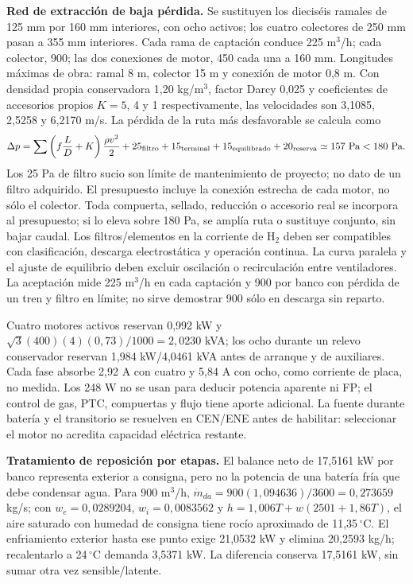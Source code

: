 \textbf{Red de extracción de baja pérdida.} Se sustituyen los dieciséis ramales de 125 mm por 160 mm interiores, con ocho activos; los cuatro colectores de 250 mm pasan a 355 mm interiores. Cada rama de captación conduce 225 m$^3$/h; cada colector, 900; las dos conexiones de motor, 450 cada una a 160 mm. Longitudes máximas de obra: ramal 8 m, colector 15 m y conexión de motor 0,8 m. Con densidad propia conservadora 1,20 kg/m$^3$, factor Darcy 0,025 y coeficientes de accesorios propios $K=5$, 4 y 1 respectivamente, las velocidades son 3,1085, 2,5258 y 6,2170 m/s. La pérdida de la ruta más desfavorable se calcula como
\[
\Delta p=\sum\left(f\frac{L}{D}+K\right)\frac{\rho v^2}{2}
       +25_{\rm filtro}+15_{\rm terminal}+15_{\rm equilibrado}+20_{\rm reserva}
       \simeq157\ {\rm Pa}<180\ {\rm Pa}.
\]
Los 25 Pa de filtro sucio son límite de mantenimiento de proyecto; no dato de un filtro adquirido. El presupuesto incluye la conexión estrecha de cada motor, no sólo el colector. Toda compuerta, sellado, reducción o accesorio real se incorpora al presupuesto; si lo eleva sobre 180 Pa, se amplía ruta o sustituye conjunto, sin bajar caudal. Los filtros/elementos en la corriente de H$_2$ deben ser compatibles con clasificación, descarga electrostática y operación continua. La curva paralela y el ajuste de equilibrio deben excluir oscilación o recirculación entre ventiladores. La aceptación mide 225 m$^3$/h en cada captación y 900 por banco con pérdida de un tren y filtro en límite; no sirve demostrar 900 sólo en descarga sin reparto.

Cuatro motores activos reservan 0,992 kW y $\sqrt{3}(400)(4)(0,73)/1000=2,0230$ kVA; los ocho durante un relevo conservador reservan 1,984 kW/4,0461 kVA antes de arranque y de auxiliares. Cada fase absorbe 2,92 A con cuatro y 5,84 A con ocho, como corriente de placa, no medida. Los 248 W no se usan para deducir potencia aparente ni FP; el control de gas, PTC, compuertas y flujo tiene aporte adicional. La fuente durante batería y el transitorio se resuelven en CEN/ENE antes de habilitar: seleccionar el motor no acredita capacidad eléctrica restante.

\textbf{Tratamiento de reposición por etapas.} El balance neto de 17,5161 kW por banco representa exterior a consigna, pero no la potencia de una batería fría que debe condensar agua. Para 900 m$^3$/h, $\dot m_{da}=900(1,094636)/3600=0,273659$ kg/s; con $w_e=0,0289204$, $w_i=0,0083562$ y $h=1,006T+w(2501+1,86T)$, el aire saturado con humedad de consigna tiene rocío aproximado de 11,35\,$^{\circ}$C. El enfriamiento exterior hasta ese punto exige 21,0532 kW y elimina 20,2593 kg/h; recalentarlo a 24\,$^{\circ}$C demanda 3,5371 kW. La diferencia conserva 17,5161 kW, sin sumar otra vez sensible/latente.

